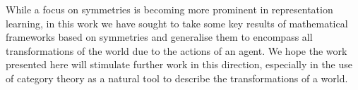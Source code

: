 While a focus on symmetries is becoming more prominent in representation learning, in this work we have sought to take some key results of mathematical frameworks based on symmetries and generalise them to encompass all transformations of the world due to the actions of an agent.
We hope the work presented here will stimulate further work in this direction, especially in the use of category theory as a natural tool to describe the transformations of a world.



